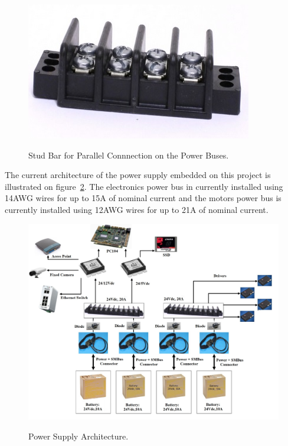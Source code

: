 \documentclass{ifacconf}
\begin{document}
\begin{figure}[ht]
\centering
    \includegraphics[width=0.6\columnwidth]{figs/bar2.jpg}  %
    \label{fig:bar}
\caption{Stud Bar for Parallel Connnection on the Power Buses.}\vspace{-0.25cm}
\end{figure}

The current architecture of the power supply embedded on this project is
illustrated on figure~\ref{fig:DiagramaSAM}. The electronics power bus in
currently installed using 14AWG wires for up to 15A of nominal current and the
motors power bus is currently installed using 12AWG wires for up to 21A of
nominal current.

\begin{figure}[ht]
\centering
    \includegraphics[angle=90,width=1\columnwidth]{figs/DiagramaSAM.jpg}  %
    \label{fig:DiagramaSAM}
\caption{Power Supply Architecture.}\vspace{-0.25cm}
\end{figure}
\end{document}
